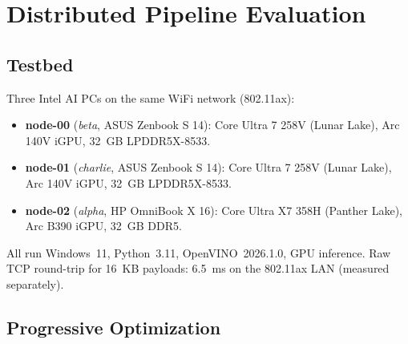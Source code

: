 \documentclass[11pt]{article}
\begin{document}
\section{Distributed Pipeline Evaluation}
\label{sec:distributed}

\subsection{Testbed}
\label{sec:testbed}

Three Intel AI PCs on the same WiFi network (802.11ax):

\begin{itemize}[leftmargin=*]
  \item \textbf{node-00} (\emph{beta}, ASUS Zenbook S 14): Core Ultra 7 258V (Lunar Lake), Arc 140V iGPU, 32~GB LPDDR5X-8533.
  \item \textbf{node-01} (\emph{charlie}, ASUS Zenbook S 14): Core Ultra 7 258V (Lunar Lake), Arc 140V iGPU, 32~GB LPDDR5X-8533.
  \item \textbf{node-02} (\emph{alpha}, HP OmniBook X 16): Core Ultra X7 358H (Panther Lake), Arc B390 iGPU, 32~GB DDR5.
\end{itemize}

All run Windows~11, Python~3.11, OpenVINO~2026.1.0, GPU inference. Raw TCP round-trip for 16~KB payloads: 6.5~ms on the 802.11ax LAN (measured separately).

\subsection{Progressive Optimization}
\label{sec:fullstack}
\end{document}
